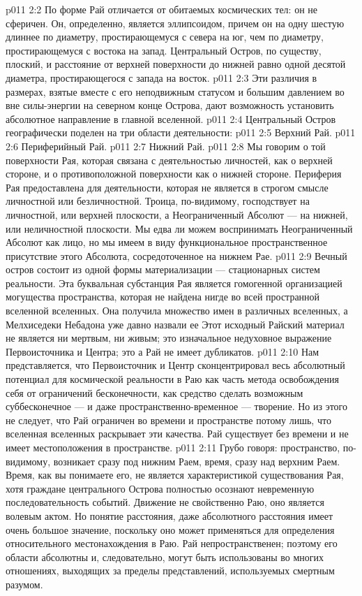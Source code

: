\vs p011 2:2 \pc По форме Рай отличается от обитаемых космических тел: он не сферичен. Он, определенно, является эллипсоидом, причем он на одну шестую длиннее по диаметру, простирающемуся с севера на юг, чем по диаметру, простирающемуся с востока на запад. Центральный Остров, по существу, плоский, и расстояние от верхней поверхности до нижней равно одной десятой диаметра, простирающегося с запада на восток.
\vs p011 2:3 Эти различия в размерах, взятые вместе с его неподвижным статусом и большим давлением во вне силы\hyp{}энергии на северном конце Острова, дают возможность установить абсолютное направление в главной вселенной.
\vs p011 2:4 \pc Центральный Остров географически поделен на три области деятельности:
\vs p011 2:5 \bibnobreakspace Верхний Рай.
\vs p011 2:6 \bibnobreakspace Периферийный Рай.
\vs p011 2:7 \bibnobreakspace Нижний Рай.
\vs p011 2:8 \pc Мы говорим о той поверхности Рая, которая связана с деятельностью личностей, как о верхней стороне, и о противоположной поверхности как о нижней стороне. Периферия Рая предоставлена для деятельности, которая не является в строгом смысле личностной или безличностной. Троица, по\hyp{}видимому, господствует на личностной, или верхней плоскости, а Неограниченный Абсолют --- на нижней, или неличностной плоскости. Мы едва ли можем воспринимать Неограниченный Абсолют как лицо, но мы имеем в виду функциональное пространственное присутствие этого Абсолюта, сосредоточенное на нижнем Рае.
\vs p011 2:9 \pc Вечный остров состоит из одной формы материализации --- стационарных систем реальности. Эта буквальная субстанция Рая является гомогенной организацией могущества пространства, которая не найдена нигде во всей пространной вселенной вселенных. Она получила множество имен в различных вселенных, а Мелхиседеки Небадона уже давно назвали ее  Этот исходный Райский материал не является ни мертвым, ни живым; это изначальное недуховное выражение Первоисточника и Центра; это  а Рай не имеет дубликатов.
\vs p011 2:10 Нам представляется, что Первоисточник и Центр сконцентрировал весь абсолютный потенциал для космической реальности в Раю как часть метода освобождения себя от ограничений бесконечности, как средство сделать возможным суббесконечное --- и даже пространственно\hyp{}временное --- творение. Но из этого не следует, что Рай ограничен во времени и пространстве потому лишь, что вселенная вселенных раскрывает эти качества. Рай существует без времени и не имеет местоположения в пространстве.
\vs p011 2:11 Грубо говоря: пространство, по\hyp{}видимому, возникает сразу под нижним Раем, время, сразу над верхним Раем. Время, как вы понимаете его, не является характеристикой существования Рая, хотя граждане центрального Острова полностью осознают невременную последовательность событий. Движение не свойственно Раю, оно является волевым актом. Но понятие расстояния, даже абсолютного расстояния имеет очень большое значение, поскольку оно может применяться для определения относительного местонахождения в Раю. Рай непространственен; поэтому его области абсолютны и, следовательно, могут быть использованы во многих отношениях, выходящих за пределы представлений, используемых смертным разумом.

